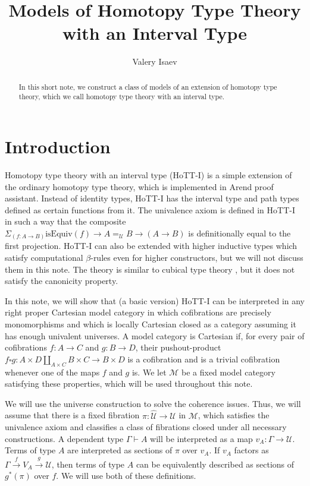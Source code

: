 \documentclass{amsart}
\theoremstyle{definition}
\theoremstyle{remark}
\newcommand{\U}{\mathcal{U}}
\newcommand{\hU}{\widehat{\mathcal{U}}}
\numberwithin{figure}{section}
\begin{document}
\title{Models of Homotopy Type Theory with an Interval Type}

\author{Valery Isaev}

\begin{abstract}
In this short note, we construct a class of models of an extension of homotopy type theory, which we call homotopy type theory with an interval type.
\end{abstract}

\maketitle

\section{Introduction}

Homotopy type theory with an interval type (HoTT-I) is a simple extension of the ordinary homotopy type theory, which is implemented in Arend proof assistant.
Instead of identity types, HoTT-I has the interval type and path types defined as certain functions from it.
The univalence axiom is defined in HoTT-I in such a way that the composite $\Sigma_{(f : A \to B)} \mathrm{isEquiv}(f) \to A =_\mathcal{U} B \to (A \to B)$ is definitionally equal to the first projection.
HoTT-I can also be extended with higher inductive types which satisfy computational $\beta$-rules even for higher constructors, but we will not discuss them in this note.
The theory is similar to cubical type theory \cite{cubical-tt}, but it does not satisfy the canonicity property.

In this note, we will show that (a basic version) HoTT-I can be interpreted in any right proper Cartesian model category in which cofibrations are precisely monomorphisms and which is locally Cartesian closed as a category assuming it has enough univalent universes.
A model category is Cartesian if, for every pair of cofibrations $f : A \to C$ and $g : B \to D$, their pushout-product $f \square g : A \times D \amalg_{A \times C} B \times C \to B \times D$ is a cofibration and is a trivial cofibration whenever one of the maps $f$ and $g$ is.
We let $\mathcal{M}$ be a fixed model category satisfying these properties, which will be used throughout this note.

We will use the universe construction \cite{kap-lum-voe} to solve the coherence issues.
Thus, we will assume that there is a fixed fibration $\pi : \hU \to \U$ in $\mathcal{M}$, which satisfies the univalence axiom and classifies a class of fibrations closed under all necessary constructions.
A dependent type $\Gamma \vdash A$ will be interpreted as a map $v_A : \Gamma \to \U$.
Terms of type $A$ are interpreted as sections of $\pi$ over $v_A$.
If $v_A$ factors as $\Gamma \xrightarrow{f} V_A \xrightarrow{g} \U$, then terms of type $A$ can be equivalently described as sections of $g^*(\pi)$ over $f$.
We will use both of these definitions.
\end{document}
